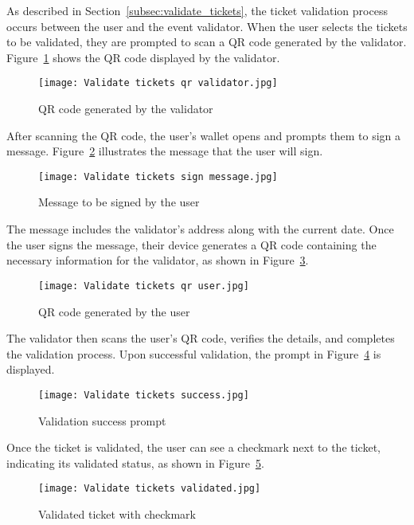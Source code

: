 As described in Section~\ref{subsec:validate_tickets}, the ticket validation
process occurs between the user and the event validator. When the user selects
the tickets to be validated, they are prompted to scan a QR code generated by
the validator. Figure~\ref{fig:validate_tickets_qr_validator} shows the QR code
displayed by the validator.

\begin{figure}[H]
    \texttt{[image: Validate tickets qr validator.jpg]}
    \centering
    \caption{QR code generated by the validator}\label{fig:validate_tickets_qr_validator}
\end{figure}

After scanning the QR code, the user's wallet opens and prompts them to sign a
message. Figure~\ref{fig:validate_tickets_sign_message} illustrates the message
that the user will sign.

\begin{figure}[H]
    \texttt{[image: Validate tickets sign message.jpg]}
    \centering
    \caption{Message to be signed by the user}\label{fig:validate_tickets_sign_message}
\end{figure}

The message includes the validator's address along with the current date. Once
the user signs the message, their device generates a QR code containing the
necessary information for the validator, as shown in
Figure~\ref{fig:validate_tickets_qr_user}.

\begin{figure}[H]
    \texttt{[image: Validate tickets qr user.jpg]}
    \centering
    \caption{QR code generated by the user}\label{fig:validate_tickets_qr_user}
\end{figure}

The validator then scans the user's QR code, verifies the details, and
completes the validation process. Upon successful validation, the prompt in
Figure~\ref{fig:validate_tickets_success} is displayed.

\begin{figure}[H]
    \texttt{[image: Validate tickets success.jpg]}
    \centering
    \caption{Validation success prompt}\label{fig:validate_tickets_success}
\end{figure}

Once the ticket is validated, the user can see a checkmark next to the ticket,
indicating its validated status, as shown in
Figure~\ref{fig:validate_tickets_validated}.

\begin{figure}[H]
    \texttt{[image: Validate tickets validated.jpg]}
    \centering
    \caption{Validated ticket with checkmark}\label{fig:validate_tickets_validated}
\end{figure}
